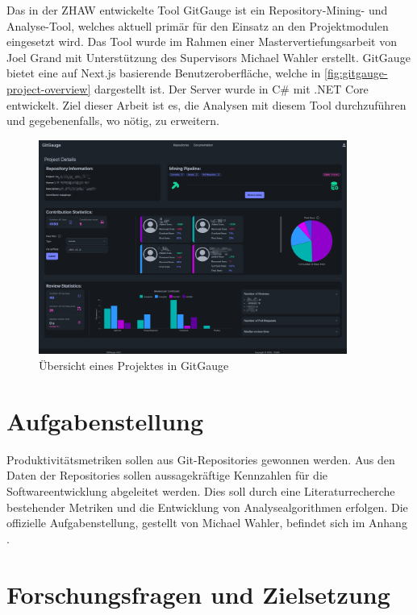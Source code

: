 Das in der ZHAW entwickelte Tool GitGauge ist ein Repository-Mining- und Analy\-se-Tool, welches aktuell primär für den Einsatz an den Projektmodulen eingesetzt wird. Das Tool wurde im Rahmen einer Mastervertiefungsarbeit von Joel Grand mit Unterstützung des Supervisors Michael Wahler erstellt. GitGauge bietet eine auf Next.js basierende Benutzeroberfläche, welche in \autoref{fig:gitgauge-project-overview} dargestellt ist. Der Server wurde in C\# mit .NET Core entwickelt. Ziel dieser Arbeit ist es, die Analysen mit diesem Tool durchzuführen und gegebenenfalls, wo nötig, zu erweitern. \parencite{grand_joel_wahler_michael_waspe_lara_stumpf_simon_repo_nodate}

\begin{figure}[htbp]
    \centering
    \includegraphics[width=0.9\textwidth]{Figures/giggauge-overview.png}
    \caption{Übersicht eines Projektes in GitGauge}
    \label{fig:gitgauge-project-overview}
\end{figure}

\section{Aufgabenstellung}
Produktivitätsmetriken sollen aus Git-Repositories gewonnen werden. Aus den Daten der Repositories sollen aussagekräftige Kennzahlen für die Softwareentwicklung abgeleitet werden. Dies soll durch eine Literaturrecherche bestehender Metriken und die Entwicklung von Analysealgorithmen erfolgen.
Die offizielle Aufgabenstellung, gestellt von Michael Wahler, befindet sich im Anhang .

\section{Forschungsfragen und Zielsetzung}
\label{sec:Zielsetzung}

